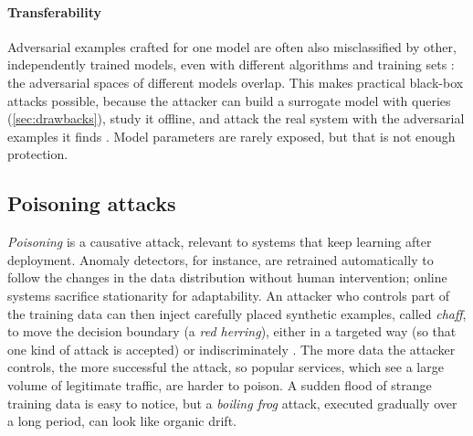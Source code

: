 \paragraph{Transferability} Adversarial examples crafted for one model are often also misclassified by
other, independently trained models, even with different algorithms and training sets
\citep{szegedy2014intriguing,papernot2016transferability}: the adversarial spaces of different models
overlap. This makes practical black-box attacks possible, because the attacker can build a surrogate
model with queries (\cref{sec:drawbacks}), study it offline, and attack the real system with the
adversarial examples it finds \citep{papernot2017practical}. Model parameters are rarely exposed, but
that is not enough protection.

\subsection{Poisoning attacks}

\emph{Poisoning} is a causative attack, relevant to systems that keep learning after deployment. Anomaly
detectors, for instance, are retrained automatically to follow the changes in the data distribution
without human intervention; online systems sacrifice stationarity for adaptability. An attacker who
controls part of the training data can then inject carefully placed synthetic examples, called
\emph{chaff}, to move the decision boundary (a \emph{red herring}), either in a targeted way (so that one
kind of attack is accepted) or indiscriminately \citep{biggio2012poisoning}. The more data the
attacker controls, the more successful the attack, so popular services, which see a large volume of
legitimate traffic, are harder to poison. A sudden flood of strange training data is easy to notice, but
a \emph{boiling frog} attack, executed gradually over a long period, can look like organic drift.

